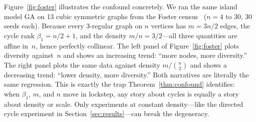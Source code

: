 
Figure~\ref{fig:foster} illustrates the confound concretely. We ran the
same island model GA on 13 cubic symmetric graphs from the Foster
census~\cite{foster1988census} ($n = 4$ to $30$, 30 seeds each). Because
every 3-regular graph on $n$ vertices has $m = 3n/2$ edges, the cycle
rank $\beta_1 = n/2 + 1$, and the density $m/n = 3/2$---all three
quantities are affine in~$n$, hence perfectly collinear. The left panel
of Figure~\ref{fig:foster} plots diversity against~$n$ and shows an
increasing trend: ``more nodes, more diversity.'' The right panel plots
the same data against density $m/\binom{n}{2}$ and shows a decreasing
trend: ``lower density, more diversity.'' Both narratives are literally
the same regression. This is exactly the trap Theorem~\ref{thm:confound}
identifies: when $\beta_1$, $m$, and $n$ move in lockstep, any
story about cycles is equally a story about density or scale. Only
experiments at constant density---like the directed cycle experiment in
Section~\ref{sec:results}---can break the degeneracy.
